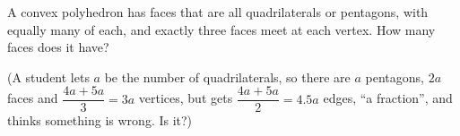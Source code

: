 A convex polyhedron has faces that are all quadrilaterals or pentagons, with equally many of each, and exactly three faces meet at each vertex. How many faces does it have?

(A student lets $a$ be the number of quadrilaterals, so there are $a$ pentagons, $2a$ faces and $\dfrac{4a+5a}{3}=3a$ vertices, but gets $\dfrac{4a+5a}{2}=4.5a$ edges, ``a fraction'', and thinks something is wrong. Is it?)
